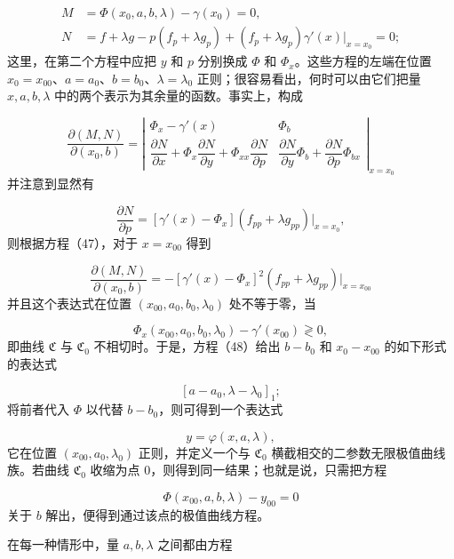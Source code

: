 \documentclass[11pt,a4paper,leqno]{article}
\begin{document}
\begin{equation}\tag{48}
\begin{aligned}
M&=\Phi(x_0,a,b,\lambda)-\gamma(x_0)=0,\\
N&=f+\lambda g-p(f_p+\lambda g_p)+(f_p+\lambda g_p)\gamma'(x)\big|_{x=x_0}=0;
\end{aligned}
\end{equation}
这里，在第二个方程中应把 $y$ 和 $p$ 分别换成 $\Phi$ 和 $\Phi_x$。这些方程的左端在位置 $x_0=x_{00}$、$a=a_0$、$b=b_0$、$\lambda=\lambda_0$ 正则；很容易看出，何时可以由它们把量 $x,a,b,\lambda$ 中的两个表示为其余量的函数。事实上，构成

\[
\frac{\partial(M,N)}{\partial(x_0,b)}=
\left|\begin{array}{cc}
\Phi_x-\gamma'(x)&\Phi_b\\[.6ex]
\dfrac{\partial N}{\partial x}+\Phi_x\dfrac{\partial N}{\partial y}+\Phi_{xx}\dfrac{\partial N}{\partial p}&
\dfrac{\partial N}{\partial y}\Phi_b+\dfrac{\partial N}{\partial p}\Phi_{bx}
\end{array}\right|_{x=x_0}
\]
并注意到显然有

\[
\frac{\partial N}{\partial p}=[\gamma'(x)-\Phi_x](f_{pp}+\lambda g_{pp})\big|_{x=x_0},
\]
则根据方程（47），对于 $x=x_{00}$ 得到

\[
\frac{\partial(M,N)}{\partial(x_0,b)}=-[\gamma'(x)-\Phi_x]^2(f_{pp}+\lambda g_{pp})\big|_{x=x_{00}}
\]
并且这个表达式在位置 $(x_{00},a_0,b_0,\lambda_0)$ 处不等于零，当

\[
\Phi_x(x_{00},a_0,b_0,\lambda_0)-\gamma'(x_{00})\gtrless 0,
\]
即曲线 $\mathfrak{C}$ 与 $\mathfrak{C}_0$ 不相切时。于是，方程（48）给出 $b-b_0$ 和 $x_0-x_{00}$ 的如下形式的表达式

\[
[a-a_0,\lambda-\lambda_0]_1;
\]
将前者代入 $\Phi$ 以代替 $b-b_0$，则可得到一个表达式

\begin{equation}\tag{49}
y=\varphi(x,a,\lambda),
\end{equation}
它在位置 $(x_{00},a_0,\lambda_0)$ 正则，并定义一个与 $\mathfrak{C}_0$ 横截相交的二参数无限极值曲线族。若曲线 $\mathfrak{C}_0$ 收缩为点 0，则得到同一结果；也就是说，只需把方程

\begin{equation}\tag{50}
\Phi(x_{00},a,b,\lambda)-y_{00}=0
\end{equation}
关于 $b$ 解出，便得到通过该点的极值曲线方程。

在每一种情形中，量 $a,b,\lambda$ 之间都由方程
\end{document}
